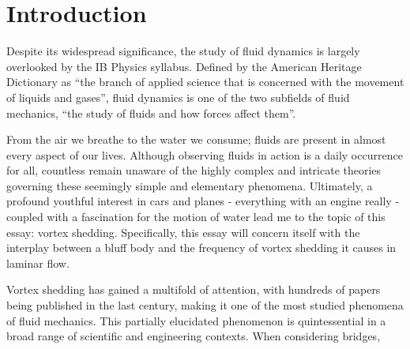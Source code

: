 \section*{Introduction}
Despite its widespread significance, the study of fluid dynamics is largely overlooked by the IB Physics syllabus. Defined by the American Heritage Dictionary as “the branch of applied science that is concerned with the movement of liquids and gases”, fluid dynamics is one of the two subfields of fluid mechanics, “the study of fluids and how forces affect them”. 

From the air we breathe to the water we consume; fluids are present in almost every aspect of our lives. Although observing fluids in action is a daily occurrence for all, countless remain unaware of the highly complex and intricate theories governing these seemingly simple and elementary phenomena. Ultimately, a profound youthful interest in cars and planes - everything with an engine really - coupled with a fascination for the motion of water lead me to the topic of this essay: vortex shedding. Specifically, this essay will concern itself with the interplay between a bluff body and the frequency of vortex shedding it causes in laminar flow. 

Vortex shedding has gained a multifold of attention, with hundreds of papers being published in the last century, making it one of the most studied phenomena of fluid mechanics. This partially elucidated phenomenon is quintessential in a broad range of scientific and engineering contexts. When considering bridges, 